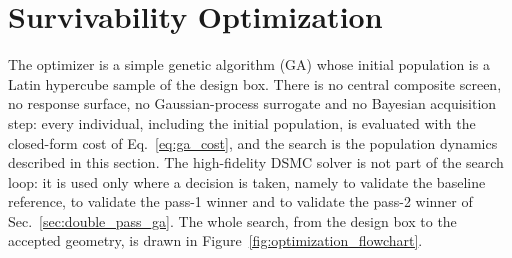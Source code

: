 \section{Survivability Optimization}
\label{sec:ga_opt}

The optimizer is a simple genetic algorithm (GA) whose initial population is a Latin hypercube sample of the design box. There is no central composite screen, no response surface, no Gaussian-process surrogate and no Bayesian acquisition step: every individual, including the initial population, is evaluated with the closed-form cost of Eq.~\eqref{eq:ga_cost}, and the search is the population dynamics described in this section. The high-fidelity DSMC solver is not part of the search loop: it is used only where a decision is taken, namely to validate the baseline reference, to validate the pass-1 winner and to validate the pass-2 winner of Sec.~\ref{sec:double_pass_ga}. The whole search, from the design box to the accepted geometry, is drawn in Figure~\ref{fig:optimization_flowchart}.

